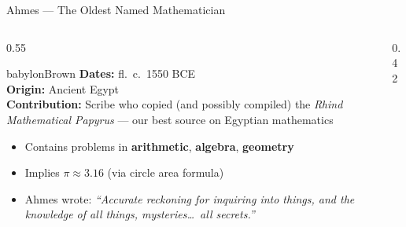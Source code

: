 \begin{frame}[shrink=4]{Ahmes --- The Oldest Named Mathematician}

  \begin{columns}[T]
    \begin{column}{0.55\textwidth}
      \begin{personbox}{babylonBrown}
        \small
        \textbf{Dates:} fl.\ c.\ 1550 BCE\\
        \textbf{Origin:} Ancient Egypt\\
        \textbf{Contribution:} Scribe who copied (and possibly compiled) the
        \emph{Rhind Mathematical Papyrus} --- our best source on Egyptian mathematics
      \end{personbox}

      \vspace{0.4em}
      \begin{itemize}
        \item Contains problems in \textbf{arithmetic}, \textbf{algebra}, \textbf{geometry}
        \item Implies $\pi \approx 3.16$ (via circle area formula)
        \item Ahmes wrote: \emph{``Accurate reckoning for inquiring into things, and the knowledge of all things, mysteries\ldots\ all secrets.''}
      \end{itemize}
    \end{column}

    \begin{column}{0.42\textwidth}
    \end{column}
  \end{columns}

\end{frame}

